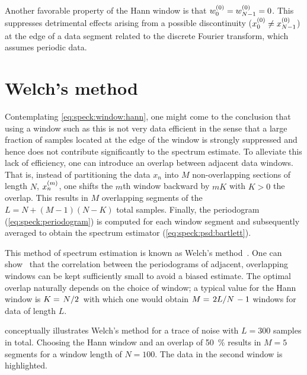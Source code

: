 Another favorable property of the Hann window is that $w_0^{(0)} = w_{N-1}^{(0)} = 0$.
This suppresses detrimental effects arising from a possible discontinuity ($x_0^{(0)}\neq x_{N-1}^{(0)}$) at the edge of a data segment related to the discrete Fourier transform, which assumes periodic data.

\section{Welch's method}\label{sec:speck:theory:welch}
Contemplating \cref{eq:speck:window:hann}, one might come to the conclusion that using a window such as this is not very data efficient in the sense that a large fraction of samples located at the edge of the window is strongly suppressed and hence does not contribute significantly to the spectrum estimate.
To alleviate this lack of efficiency, one can introduce an overlap between adjacent data windows.
That is, instead of partitioning the data $x_n$ into $M$ non-overlapping sections of length $N$, $x_n^{(m)}$, one shifts the $m$th window backward by $mK$ with $K>0$ the overlap.
This results in $M$ overlapping segments of the $L = N + (M - 1)(N - K)$ total samples.
Finally, the periodogram (\cref{eq:speck:periodogram}) is computed for each window segment and subsequently averaged to obtain the spectrum estimator (\cref{eq:speck:psd:bartlett}).

This method of spectrum estimation is known as Welch's method~\cite{Welch1967}.
One can show~\cite{Welch1967} that the correlation between the periodograms of adjacent, overlapping windows can be kept sufficiently small to avoid a biased estimate.
The optimal overlap naturally depends on the choice of window; a typical value for the Hann window is $K = \flatfrac{N}{2}$ with which one would obtain $M = \flatfrac{2L}{N} - 1$ windows for data of length $L$.

 conceptually illustrates Welch's method for a trace of \oneoverf noise with $L = 300$ samples in total.
Choosing the Hann window and an overlap of \qty{50}{\percent} results in $M=5$ segments for a window length of $N=100$.
The data in the second window is highlighted.

